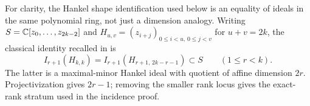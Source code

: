 For clarity, the Hankel shape identification used below is an equality
of ideals in the same polynomial ring, not just a dimension analogy.
Writing $S=\mathbb C[z_0,\ldots,z_{2k-2}]$ and
$H_{u,v}=(z_{i+j})_{0\le i<u,\,0\le j<v}$ for $u+v=2k$,
the classical identity recalled in \cite[Section 1]{CMSV} is
\[
 I_{r+1}(H_{k,k})=I_{r+1}(H_{r+1,\,2k-r-1})\subset S
       \qquad(1\le r<k).
\]
The latter is a maximal-minor Hankel ideal with quotient of affine
dimension $2r$. Projectivization gives $2r-1$; removing the smaller
rank locus gives the exact-rank stratum used in the incidence proof.
